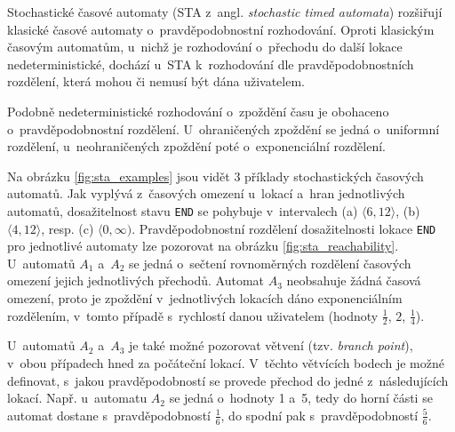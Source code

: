 Stochastické časové automaty (STA z~angl. \textit{stochastic timed automata}) rozšiřují klasické časové automaty o~pravděpodobnostní rozhodování. Oproti klasickým časovým automatům, u~nichž je rozhodování o~přechodu do další lokace nedeterministické, dochází u~STA k~rozhodování dle pravděpodobnostních rozdělení, která mohou či nemusí být dána uživatelem.

Podobně nedeterministické rozhodování o~zpoždění času je obohaceno o~pravděpodobnostní rozdělení. U~ohraničených zpoždění se jedná o~uniformní rozdělení, u~neohraničených zpoždění poté o~exponenciální rozdělení.

Na obrázku \ref{fig:sta_examples} jsou vidět 3 příklady stochastických časových automatů. Jak vyplývá z~časových omezení u~lokací a~hran jednotlivých automatů, dosažitelnost stavu \texttt{END} se pohybuje v~intervalech (a) $\langle 6, 12 \rangle$, (b) $\langle 4, 12 \rangle$, resp. (c) $\langle 0, \infty )$. Pravděpodobnostní rozdělení dosažitelnosti lokace \texttt{END} pro jednotlivé automaty lze pozorovat na obrázku \ref{fig:sta_reachability}. U~automatů $A_1$ a~$A_2$ se jedná o~sečtení rovnoměrných rozdělení časových omezení jejich jednotlivých přechodů. Automat $A_3$ neobsahuje žádná časová omezení, proto je zpoždění v~jednotlivých lokacích dáno exponenciálním rozdělením, v~tomto případě s~rychlostí danou uživatelem (hodnoty $\frac{1}{2}$, $2$, $\frac{1}{4}$).

U~automatů $A_2$ a~$A_3$ je také možné pozorovat větvení (tzv. \textit{branch point}), v~obou případech hned za počáteční lokací. V~těchto větvících bodech je možné definovat, s~jakou pravděpodobností se provede přechod do jedné z~následujících lokací. Např. u~automatu $A_2$ se jedná o~hodnoty 1 a~5, tedy do horní části se automat dostane s~pravděpodobností $\frac{1}{6}$, do spodní pak s~pravděpodobností $\frac{5}{6}$.


